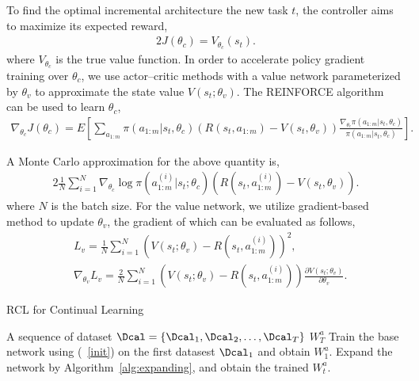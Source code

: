 \documentclass{article}
\begin{document}
To find the optimal incremental architecture the new task $t$, the controller aims  to maximize its expected reward,
\begin{alignat}{2}
J(\theta_c)=V_{\theta_c}(s_t).
\end{alignat}
where $V_{\theta_c}$ is the true value function. 
 In order to accelerate policy gradient training over $\theta_c$, we use actor–critic methods with
a value network parameterized by $\theta_v$ to approximate the state value $V(s_t; \theta_v)$.   The REINFORCE algorithm~\cite{william1} can be used to learn $\theta_c$,
\begin{align}
\label{reinforce1}
\nabla_{\theta_c}J(\theta_c) = E \left[ \sum \limits_{a_{1:m}} \pi(a_{1:m}|s_t,\theta_c)(R(s_t,a_{1:m})-V(s_t,\theta_v))\frac{\nabla_{\theta_c}\pi(a_{1:m}|s_t,\theta_c)}{\pi(a_{1:m}|s_t,\theta_c)} \right].
\end{align}

A Monte Carlo approximation for the above quantity is,
\begin{alignat}{2}
\label{policy}
\frac{1}{N}\sum_{i=1}^N\nabla_{\theta_c}\log \pi(a_{1:m}^{(i)}|s_t;\theta_c)\left(R(s_t,a_{1:m}^{(i)})-V(s_t,\theta_v)\right).
\end{alignat}
where $N$ is the batch size. For the value network, we utilize  gradient-based method to update $\theta_v$, the gradient of which can be evaluated as follows, 
\begin{align}
\label{valuenet}
&L_v = \frac{1}{N}\sum_{i=1}^N(V(s_t;\theta_v) - R(s_t,a^{(i)}_{1:m}))^2, \nonumber \\
&\nabla_{\theta_v} L_v = \frac{2}{N}\sum_{i=1}^N\left( V(s_t;\theta_v) - R(s_t,a^{(i)}_{1:m}) \right) \frac{\partial V(s_t;\theta_v)}{\partial \theta_v}.
\end{align}


\begin{algorithm}[tb]
  \caption{RCL for Continual Learning}
  \label{alg:rcl}
  \begin{algorithmic}[1]
     A sequence of dataset $\Dcal=\{ \Dcal_1, \Dcal_2,\dots,\Dcal_T \}$ 
     $W_T^a$
    \STATE Train the base network using (~\ref{init}) on the first datasest $\Dcal_1$ and obtain $W_1^a$.
    \ELSE
    \STATE Expand  the network by Algorithm~\ref{alg:expanding}, and obtain the trained  $W_t^a$.
    \ENDIF
    \ENDFOR
  \end{algorithmic}
\end{algorithm}
\end{document}
